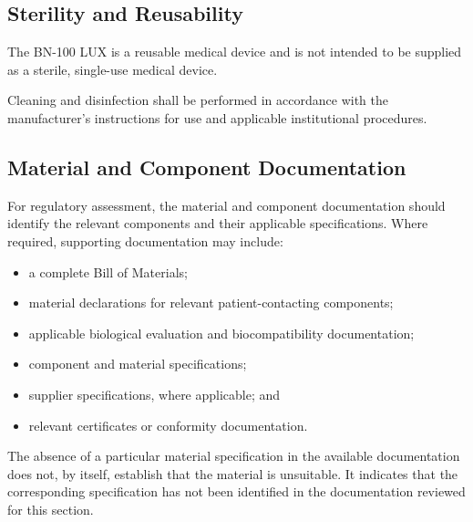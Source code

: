 \subsection*{Sterility and Reusability}

The BN-100 LUX is a reusable medical device and is not intended to
be supplied as a sterile, single-use medical device.

Cleaning and disinfection shall be performed in accordance with
the manufacturer's instructions for use and applicable institutional
procedures.


\subsection*{Material and Component Documentation}

For regulatory assessment, the material and component documentation
should identify the relevant components and their applicable
specifications. Where required, supporting documentation may include:

\begin{itemize}
    \item a complete Bill of Materials;
    \item material declarations for relevant patient-contacting
    components;
    \item applicable biological evaluation and biocompatibility
    documentation;
    \item component and material specifications;
    \item supplier specifications, where applicable; and
    \item relevant certificates or conformity documentation.
\end{itemize}

The absence of a particular material specification in the available
documentation does not, by itself, establish that the material is
unsuitable. It indicates that the corresponding specification has
not been identified in the documentation reviewed for this section.

